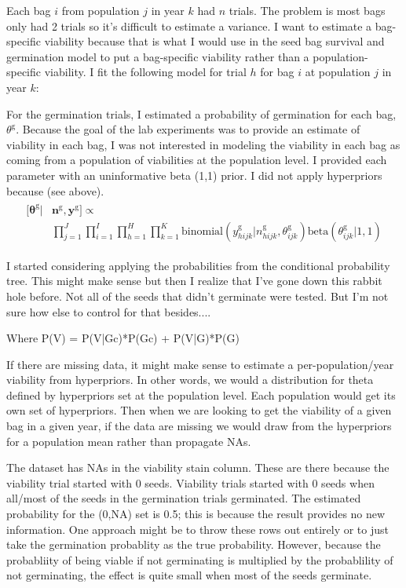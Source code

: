 \documentclass[12pt, oneside, titlepage]{article}   	%
\begin{document}
\iffalse
Each bag $i$ from population $j$ in year $k$ had $n$ trials. The problem is most bags only had 2 trials so it's difficult to estimate a variance. I want to estimate a bag-specific viability because that is what I would use in the seed bag survival and germination model to put a bag-specific viability rather than a population-specific viability. I fit the following model for trial $h$ for bag $i$ at population $j$ in year $k$:

For the germination trials, I estimated a probability of germination for each bag, $\theta^\mathrm{g}$. Because the goal of the lab experiments was to provide an estimate of viability in each bag, I was not interested in modeling the viability in each bag as coming from a population of viabilities at the population level. I provided each parameter with an uninformative beta (1,1) prior. I did not apply hyperpriors because (see above).
%
\begin{align}
  \begin{split}
 [\bm{\theta^{\mathrm{g}}} | & \bm{n^{\mathrm{g}}}, \bm{y^{\mathrm{g}}} ] \propto
 \\  & \prod_{j=1}^{J} \prod_{i=1}^{I}  \prod_{h=1}^{H} \prod_{k=1}^{K}  \mathrm{binomial} ( y^{\mathrm{g}}_{hijk} | n^{\mathrm{g}}_{hijk}, \theta^{\mathrm{g}}_{ijk} )
\mathrm{beta} (  \theta^{\mathrm{g}}_{ijk} | 1 , 1 )
  \end{split}
\end{align}

I started considering applying the probabilities from the conditional probability tree. This might make sense but then I realize that I've gone down this rabbit hole before. Not all of the seeds that didn't germinate were tested. But I'm not sure how else to control for that besides....

Where P(V) = P(V|Gc)*P(Gc) + P(V|G)*P(G)

If there are missing data, it might make sense to estimate a per-population/year viability from hyperpriors. In other words, we would a distribution for theta defined by hyperpriors set at the population level. Each population would get its own set of hyperpriors. Then when we are looking to get the viability of a given bag in a given year, if the data are missing we would draw from the hyperpriors for a population mean rather than propagate NAs. 

The dataset has NAs in the viability stain column. These are there because the viability trial started with 0 seeds. Viability trials started with 0 seeds when all/most of the seeds in the germination trials germinated. The estimated probability for the (0,NA) set is 0.5; this is because the result provides no new information. One approach might be to throw these rows out entirely or to just take the germination probablity as the true probability. However, because the probabliity of being viable if not germinating is multiplied by the probablility of not germinating, the effect is quite small when most of the seeds germinate. 
\end{document}
